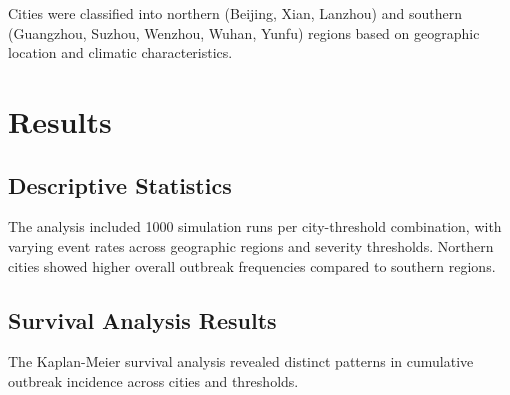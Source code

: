 \documentclass[preprint,12pt]{elsarticle}
\begin{document}

Cities were classified into northern (Beijing, Xian, Lanzhou) and southern (Guangzhou, Suzhou, Wenzhou, Wuhan, Yunfu) regions based on geographic location and climatic characteristics.


\section{Results}


\subsection{Descriptive Statistics}


The analysis included 1000 simulation runs per city-threshold combination, with varying event rates across geographic regions and severity thresholds. Northern cities showed higher overall outbreak frequencies compared to southern regions.


\subsection{Survival Analysis Results}


The Kaplan-Meier survival analysis revealed distinct patterns in cumulative outbreak incidence across cities and thresholds. %
\end{document}
